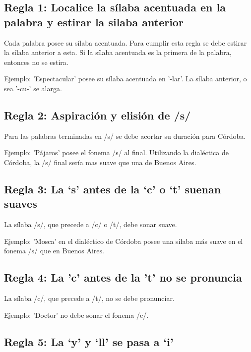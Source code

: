 \documentclass[11pt,a4paper,twoside]{tesis}
\begin{document}
\subsection*{Regla 1: Localice la sílaba acentuada en la palabra y estirar la silaba anterior}

Cada palabra posee su sílaba acentuada. Para cumplir esta regla se debe estirar la sílaba anterior a esta. Si la sílaba acentuada es la primera de la palabra, entonces no se estira. 

Ejemplo: 'Espectacular' posee su sílaba acentuada en '-lar'. La sílaba anterior, o sea '-cu-' se alarga. 


\subsection*{Regla 2: Aspiración y elisión de /s/}

Para las palabras terminadas en /s/ se debe acortar su duración para Córdoba. 

Ejemplo: 'Pájaros' posee el fonema /s/ al final. Utilizando la dialéctica de Córdoba, la /s/ final sería mas suave que una de Buenos Aires. 

\subsection*{Regla 3: La ‘s’ antes de la ‘c’ o ‘t’ suenan suaves}

La sílaba /s/, que precede a /c/ o /t/, debe sonar suave. 

Ejemplo: 'Mosca' en el dialéctico de Córdoba posee una sílaba más suave en el fonema /s/ que en Buenos Aires. 

\subsection*{Regla 4: La 'c' antes de la 't' no se pronuncia}

La sílaba /c/, que precede a /t/, no se debe pronunciar. 

Ejemplo: 'Doctor' no debe sonar el fonema /c/.

\subsection*{Regla 5: La ‘y’ y ‘ll’ se pasa a ‘i’}
\end{document}
